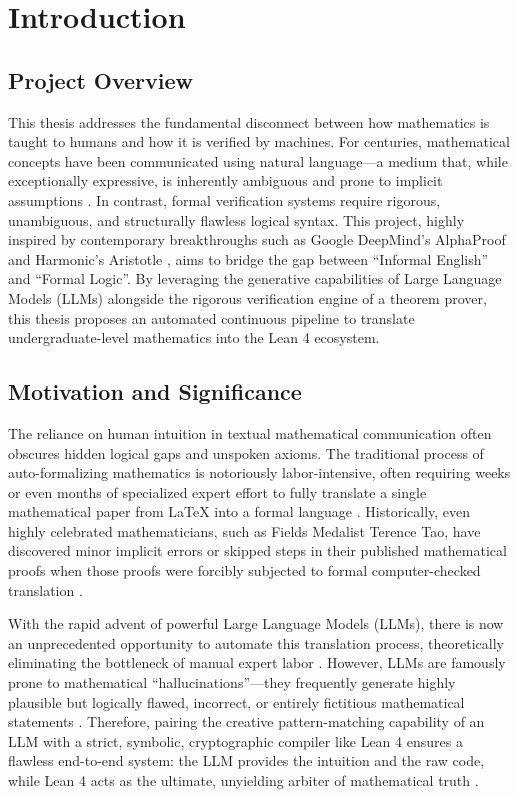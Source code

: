 \chapter{Introduction}
\label{chap:One}

\section{Project Overview}
This thesis addresses the fundamental disconnect between how mathematics is taught to humans and how it is verified by machines. For centuries, mathematical concepts have been communicated using natural language—a medium that, while exceptionally expressive, is inherently ambiguous and prone to implicit assumptions \cite{rosen2019}. In contrast, formal verification systems require rigorous, unambiguous, and structurally flawless logical syntax. This project, highly inspired by contemporary breakthroughs such as Google DeepMind's AlphaProof \cite{alphaproof2024, polu2025} and Harmonic's Aristotle \cite{hubert2025}, aims to bridge the gap between ``Informal English'' and ``Formal Logic''. By leveraging the generative capabilities of Large Language Models (LLMs) alongside the rigorous verification engine of a theorem prover, this thesis proposes an automated continuous pipeline to translate undergraduate-level mathematics into the Lean 4 ecosystem.

\section{Motivation and Significance}
The reliance on human intuition in textual mathematical communication often obscures hidden logical gaps and unspoken axioms. The traditional process of auto-formalizing mathematics is notoriously labor-intensive, often requiring weeks or even months of specialized expert effort to fully translate a single mathematical paper from LaTeX into a formal language \cite{formal_history}. Historically, even highly celebrated mathematicians, such as Fields Medalist Terence Tao, have discovered minor implicit errors or skipped steps in their published mathematical proofs when those proofs were forcibly subjected to formal computer-checked translation \cite{hubert2025}.

With the rapid advent of powerful Large Language Models (LLMs), there is now an unprecedented opportunity to automate this translation process, theoretically eliminating the bottleneck of manual expert labor \cite{llm_math}. However, LLMs are famously prone to mathematical ``hallucinations''—they frequently generate highly plausible but logically flawed, incorrect, or entirely fictitious mathematical statements \cite{llm_hallucination}. Therefore, pairing the creative pattern-matching capability of an LLM with a strict, symbolic, cryptographic compiler like Lean 4 ensures a flawless end-to-end system: the LLM provides the intuition and the raw code, while Lean 4 acts as the ultimate, unyielding arbiter of mathematical truth \cite{neural_formal}.

